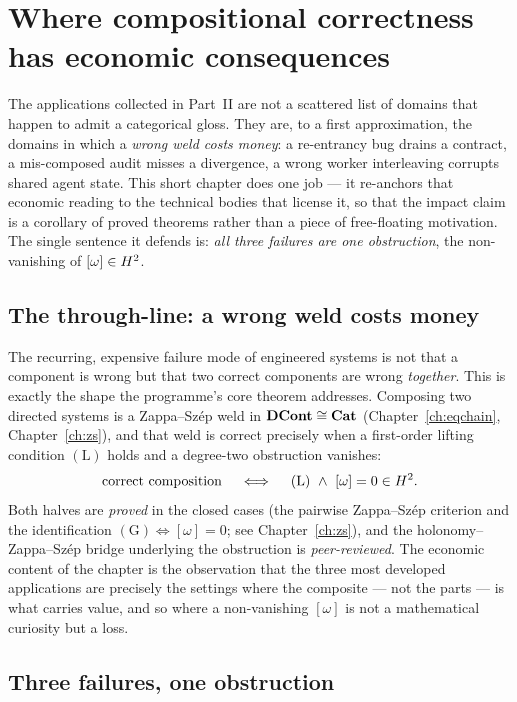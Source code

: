 \chapter{Where compositional correctness has economic consequences}
\label{ch:economic}

The applications collected in Part~II are not a scattered list of domains that happen
to admit a categorical gloss. They are, to a first approximation, the domains in which a
\emph{wrong weld costs money}: a re-entrancy bug drains a contract, a mis-composed audit
misses a divergence, a wrong worker interleaving corrupts shared agent state. This short
chapter does one job --- it re-anchors that economic reading to the technical bodies that
license it, so that the impact claim is a corollary of proved theorems rather than a piece
of free-floating motivation. The single sentence it defends is: \emph{all three failures
are one obstruction}, the non-vanishing of $[\omega]\in H^2$.

\section{The through-line: a wrong weld costs money}
\label{sec:econ-throughline}

The recurring, expensive failure mode of engineered systems is not that a component is
wrong but that two correct components are wrong \emph{together}. This is exactly the shape
the programme's core theorem addresses. Composing two directed systems is a Zappa--Sz\'ep
weld in $\mathbf{DCont}\cong\mathbf{Cat}$ (Chapter~\ref{ch:eqchain}, Chapter~\ref{ch:zs}), and that weld is
correct precisely when a first-order lifting condition $(\mathrm{L})$ holds and a
degree-two obstruction vanishes:
\[
  \text{correct composition}\quad\iff\quad (\mathrm{L})\ \wedge\ [\omega]=0\in H^2 .
\]
Both halves are \emph{proved} in the closed cases (the pairwise Zappa--Sz\'ep criterion and
the identification $(\mathrm{G})\iff[\omega]=0$; see Chapter~\ref{ch:zs}), and the
holonomy--Zappa--Sz\'ep bridge underlying the obstruction is \emph{peer-reviewed}. The
economic content of the chapter is the observation that the three most developed
applications are precisely the settings where the composite --- not the parts --- is what
carries value, and so where a non-vanishing $[\omega]$ is not a mathematical curiosity but
a loss.

\section{Three failures, one obstruction}
\label{sec:econ-three}

